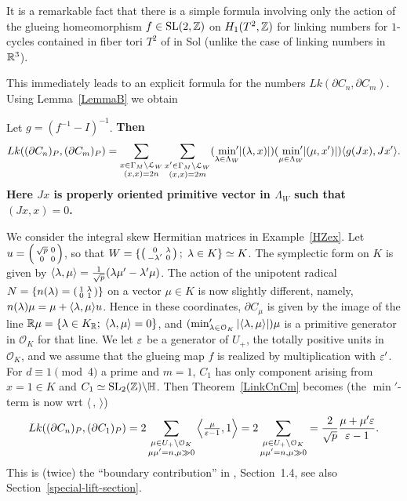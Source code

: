 It is a remarkable fact that there is a simple formula involving only the action of the
glueing homeomorphism $f \in  \operatorname{SL}(2,\mathbb{Z})$ on $H_1(T^2, \mathbb{Z})$ for linking numbers for $1$-cycles contained in fiber tori $T^2$ of in Sol (unlike the case of linking numbers in $\mathbb{R}^3$). 

This immediately leads to an explicit formula for the numbers $Lk(\partial C_n, \partial C_m)$. Using Lemma~\ref{LemmaB} we obtain

\begin{theorem}\label{LinkCnCm} 
Let $g = (f^{-1} - I)^{-1}$. \bf{Then}
 \[
 Lk( (\partial C_n)_P, (\partial C_m)_P) = \sum_{ \substack{x\in \Gamma_M \backslash \mathcal{L}_W \\ (x,x)=2n}} \sum_{\substack{x'\in \Gamma_M \backslash \mathcal{L}_W \\ (x,x)=2m}} (\min_{\lambda \in \Lambda_W}  {\hspace{-5pt}'}
 |(\lambda,x)|) (\min_{\mu \in \Lambda_W}  {\hspace{-5pt}'}
|(\mu,x')|) \langle g(Jx),Jx' \rangle. 
\]
Here $Jx$ is properly oriented primitive vector in $\Lambda_W$ such that $(Jx,x)=0$. 
 \end{theorem}

 \begin{example}\label{LinkCnCmex} 
We consider the integral skew Hermitian matrices in Example~\ref{HZex}. Let $u= \left(\begin{smallmatrix} \sqrt{p} & 0 \\ 0 & 0\end{smallmatrix}\right)$, so that $W = \{ \left(\begin{smallmatrix} 0 & \lambda \\ -\lambda' & 0\end{smallmatrix}\right);\; \lambda \in K \} \simeq K$. The symplectic form on $K$ is given by $\langle \lambda, \mu \rangle = \frac{1}{\sqrt{p}} (\lambda \mu' - \lambda'\mu)$. The action of the unipotent radical $N= \left\{ n(\lambda)= \left(\begin{smallmatrix} 1 & \lambda \\ 0 & 1\end{smallmatrix}\right) \right\}$ on a vector $\mu \in K$ is now slightly different, namely, $n(\lambda) \mu = \mu + \langle \lambda, \mu \rangle u$. Hence in these coordinates, $\partial C_{\mu}$ is given by the image of the line $\mathbb{R} \mu = \{\lambda \in K_{\mathbb{R}}; \; \langle \lambda, \mu \rangle =0 \}$, and $(\min'_{\lambda \in \mathcal{O}_K}  
 |\langle \lambda, \mu \rangle|)\mu$ is a primitive generator in $\mathcal{O}_K$ for that line. We let $\varepsilon$ be a generator of $U_+$, the totally positive units in $\mathcal{O}_K$, and we assume that the glueing map $f$ is realized by multiplication with $\varepsilon'$. For $d \equiv 1 \pmod{4}$ a prime and $m=1$, $C_1$ has only component arising from $x =1 \in K$ and $C_1 \simeq \operatorname{SL}_2(\mathbb{Z}) \backslash \mathbb{H}$. Then Theorem~\ref{LinkCnCm} becomes (the $\min'$-term is now wrt $\langle\,,\, \rangle$)
\[
 Lk( (\partial C_n)_P, (\partial C_1)_P) = 
 2 \sum_{ \substack{\mu \in U_+ \backslash \mathcal{O}_K\\ \mu\mu'=n, \mu \gg 0}} \left\langle \tfrac{\mu}{\varepsilon-1}, 1 \right\rangle = 2\sum_{ \substack{\mu \in U_+ \backslash \mathcal{O}_K\\ \mu\mu'=n, \mu \gg0}}  = \frac{2}{\sqrt{p}}\frac{\mu+\mu'\varepsilon}{\varepsilon-1}.
\]
This is (twice) the ``boundary contribution'' in \cite{HZ}, Section~1.4, see also Section~\ref{special-lift-section}.
\end{example}


